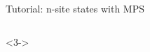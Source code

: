 \begin{frame}[fragile]{Tutorial: n-site states with MPS}
\begin{columns}
\begin{column}{4.5cm}
\begin{onlyenv}<3->
~\\
~\\
~\\
~\\
~\\
\end{onlyenv}

\end{column}

\end{columns}

\end{frame}
